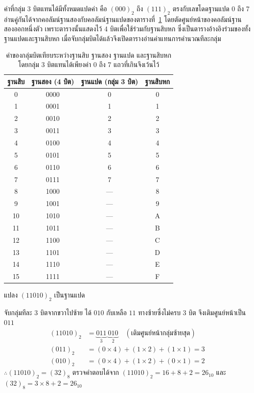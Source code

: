 ค่าที่กลุ่ม 3 บิตแทนได้มีทั้งหมดแปดค่า คือ $(000)_2$ ถึง $(111)_2$ ตรงกับเลขโดดฐานแปด 0 ถึง 7 อ่านคู่กันได้จากคอลัมน์ฐานสองกับคอลัมน์ฐานแปดของตารางที่~\ref{tab:binary-hex} โดยตัดศูนย์หน้าของคอลัมน์ฐานสองออกหนึ่งตัว เพราะตารางนั้นแสดงไว้ 4 บิตเพื่อใช้ร่วมกับฐานสิบหก ซึ่งเป็นตารางอ้างอิงร่วมของทั้งฐานแปดและฐานสิบหก เมื่อจับกลุ่มบิตได้แล้วจึงเปิดตารางอ่านค่าแทนการคำนวณทีละกลุ่ม

\begin{table}[H]
\centering
\caption{ค่าของกลุ่มบิตเทียบระหว่างฐานสิบ ฐานสอง ฐานแปด และฐานสิบหก โดยกลุ่ม 3 บิตแทนได้เพียงค่า 0 ถึง 7 แถวที่เกินจึงเว้นไว้}
\label{tab:binary-hex}
\begin{tabular}{|c|c|c|c|}
\hline
\textbf{ฐานสิบ} & \textbf{ฐานสอง (4 บิต)} & \textbf{ฐานแปด (กลุ่ม 3 บิต)} & \textbf{ฐานสิบหก} \\
\hline
0 & 0000 & 0 & 0 \\
1 & 0001 & 1 & 1 \\
2 & 0010 & 2 & 2 \\
3 & 0011 & 3 & 3 \\
4 & 0100 & 4 & 4 \\
5 & 0101 & 5 & 5 \\
6 & 0110 & 6 & 6 \\
7 & 0111 & 7 & 7 \\
8 & 1000 & --- & 8 \\
9 & 1001 & --- & 9 \\
10 & 1010 & --- & A \\
11 & 1011 & --- & B \\
12 & 1100 & --- & C \\
13 & 1101 & --- & D \\
14 & 1110 & --- & E \\
15 & 1111 & --- & F \\
\hline
\end{tabular}
\end{table}

\begin{ex}
\label{ex:bin-to-oct-group}
แปลง $(11010)_2$ เป็นฐานแปด
\end{ex}
\begin{solution}
จับกลุ่มทีละ 3 บิตจากขวาไปซ้าย ได้ $010$ กับเหลือ $11$ ทางซ้ายซึ่งไม่ครบ 3 บิต จึงเติมศูนย์หน้าเป็น $011$
\begin{align*}
(11010)_2 &= \underbrace{011}_{3}\ \underbrace{010}_{2} \quad (\text{เติมศูนย์หน้ากลุ่มซ้ายสุด})\\
(011)_2 &= (0\times4)+(1\times2)+(1\times1) = 3\\
(010)_2 &= (0\times4)+(1\times2)+(0\times1) = 2
\end{align*}
$\therefore (11010)_2 = (32)_8$ ตรวจคำตอบได้จาก $(11010)_2 = 16+8+2 = 26_{10}$ และ $(32)_8 = 3\times8+2 = 26_{10}$ \solhere
\end{solution}


